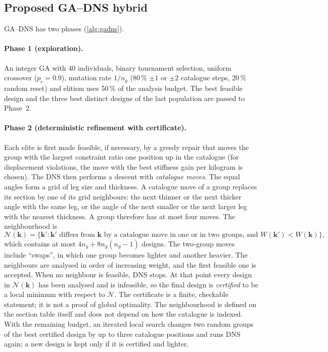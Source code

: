\documentclass[lineno,pdflatex,sn-mathphys-num]{sn-jnl}
\begin{document}
\subsection{Proposed GA--DNS hybrid}
\label{sec:gadns}

GA--DNS has two phases (\cref{alg:gadns}).

\paragraph{Phase 1 (exploration).} An integer GA with 40 individuals,
binary tournament selection, uniform crossover ($p_c=0.9$), mutation rate
$1/n_g$ (80\,\% $\pm1$ or $\pm2$ catalogue steps, 20\,\% random reset) and
elitism uses 50\,\% of the analysis budget. The best feasible design and the
three best distinct designs of the last population are passed to Phase~2.

\paragraph{Phase 2 (deterministic refinement with certificate).}
Each elite is first made feasible, if necessary, by a greedy repair that moves
the group with the largest constraint ratio one position up in the catalogue
(for displacement violations, the move with the best stiffness gain per
kilogram is chosen). The DNS then performs a descent with \emph{catalogue
moves}. The equal angles form a grid of leg size and thickness. A catalogue
move of a group replaces its section by one of its grid neighbours: the next
thinner or the next thicker angle with the same leg, or the angle of the next
smaller or the next larger leg with the nearest thickness. A group therefore
has at most four moves. The neighbourhood is
\begin{equation}
  \mathcal N(\mathbf{k})=\{\mathbf{k}' : \mathbf{k}' \text{ differs from } \mathbf{k}
  \text{ by a catalogue move in one or in two groups, and } W(\mathbf{k}')<W(\mathbf{k})\},
  \label{eq:nbhd}
\end{equation}
which contains at most $4n_g+8n_g(n_g-1)$ designs. The two-group moves
include ``swaps'', in which one group becomes lighter and another heavier. The
neighbours are analysed in order of increasing weight, and the first feasible
one is accepted. When no neighbour is feasible, DNS stops. At that point every
design in $\mathcal N(\mathbf{k})$ has been analysed and is infeasible, so the
final design is \emph{certified} to be a local minimum with respect to
$\mathcal N$. The certificate is a finite, checkable statement; it is not a
proof of global optimality. The neighbourhood is defined on the section table
itself and does not depend on how the catalogue is indexed. With the remaining
budget, an iterated local search \citep{Lourenco2003} changes two random
groups of the best certified design by up to three catalogue positions and
runs DNS again; a new design is kept only if it is certified and lighter.
\end{document}
